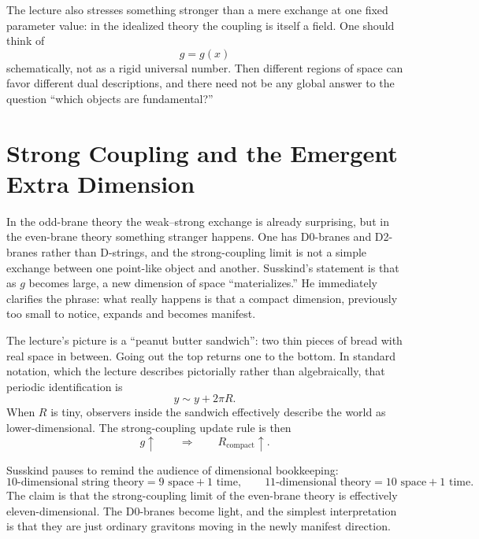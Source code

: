 The lecture also stresses something stronger than a mere exchange at one fixed parameter value: in the idealized theory the coupling is itself a field. One should think of
\begin{equation}
g = g(x)
\end{equation}
schematically, not as a rigid universal number. Then different regions of space can favor different dual descriptions, and there need not be any global answer to the question ``which objects are fundamental?''

\section{Strong Coupling and the Emergent Extra Dimension}

In the odd-brane theory the weak--strong exchange is already surprising, but in the even-brane theory something stranger happens. One has D0-branes and D2-branes rather than D-strings, and the strong-coupling limit is not a simple exchange between one point-like object and another. Susskind's statement is that as \(g\) becomes large, a new dimension of space ``materializes.'' He immediately clarifies the phrase: what really happens is that a compact dimension, previously too small to notice, expands and becomes manifest.

The lecture's picture is a ``peanut butter sandwich'': two thin pieces of bread with real space in between. Going out the top returns one to the bottom. In standard notation, which the lecture describes pictorially rather than algebraically, that periodic identification is
\begin{equation}
y \sim y + 2\pi R.
\end{equation}
When \(R\) is tiny, observers inside the sandwich effectively describe the world as lower-dimensional. The strong-coupling update rule is then
\begin{equation}
g\uparrow
\qquad \Longrightarrow \qquad
R_{\mathrm{compact}}\uparrow.
\end{equation}

Susskind pauses to remind the audience of dimensional bookkeeping:
\begin{equation}
10\text{-dimensional string theory}=9\text{ space}+1\text{ time},
\qquad
11\text{-dimensional theory}=10\text{ space}+1\text{ time}.
\end{equation}
The claim is that the strong-coupling limit of the even-brane theory is effectively eleven-dimensional. The D0-branes become light, and the simplest interpretation is that they are just ordinary gravitons moving in the newly manifest direction.

